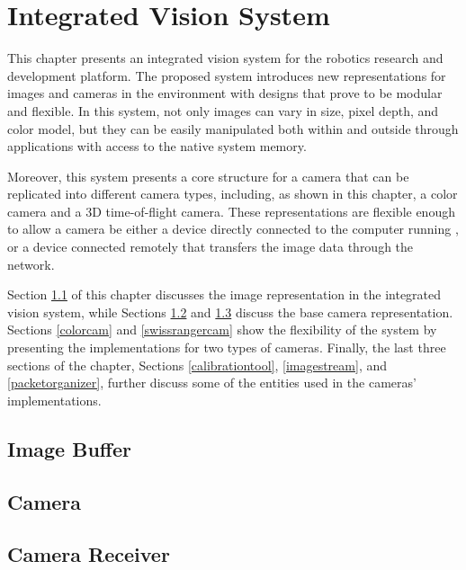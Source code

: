 \chapter{Integrated Vision System} \label{system}

This chapter presents an integrated vision system for the \RD{} robotics research and development platform.
The proposed system introduces new representations for images and cameras in the \RD{} environment with 
designs that prove to be modular and flexible. In this system, not only images can vary in size, pixel depth, 
and color model, but they can be easily manipulated both within and outside \RD{} through applications with 
access to the native system memory.

Moreover, this system presents a core structure for a camera that can be replicated into different camera
types, including, as shown in this chapter, a color camera and a 3D time-of-flight camera. These
representations are flexible enough to allow a camera be either a device directly connected to the computer 
running \RD{}, or a device connected remotely that transfers the image data through the network.

Section \ref{imagebuffer} of this chapter discusses the image representation in the integrated vision system, 
while Sections \ref{camera} and \ref{camerareceiver} discuss the base camera representation. 
Sections \ref{colorcam} and \ref{swissrangercam} show the flexibility of the system by presenting the 
implementations for two types of cameras. Finally, the last three sections of the chapter, Sections 
\ref{calibrationtool}, \ref{imagestream}, and \ref{packetorganizer}, further discuss some of the entities used in
the cameras' implementations.

\section{Image Buffer} \label{imagebuffer}


\section{Camera} \label{camera}


\section{Camera Receiver} \label{camerareceiver}

	

